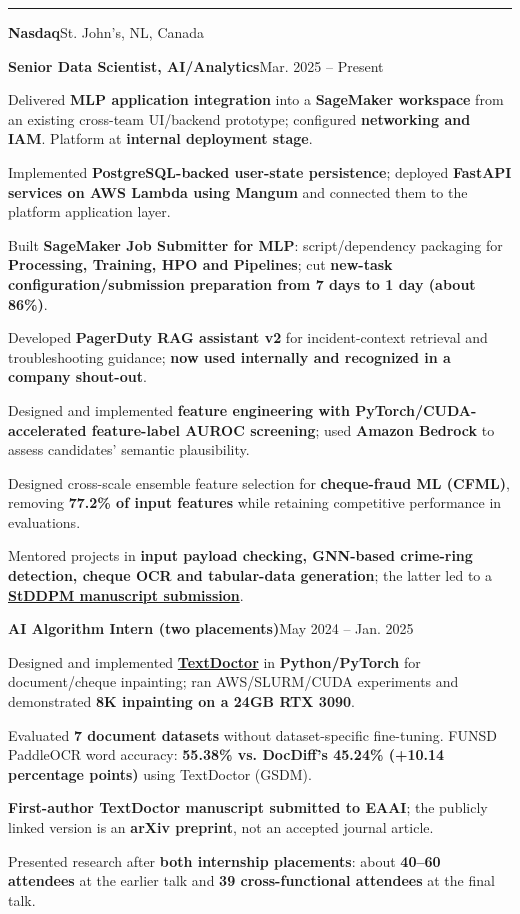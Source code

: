 \documentclass[11pt,letterpaper]{article}
\newcommand{\cvsection}[1]{\par\addvspace{6pt}{\large\bfseries #1}\par\vspace{1pt}\hrule\vspace{3pt}}
\newcommand{\company}[2]{\par\addvspace{4pt}\textbf{#1}\hfill{\small\color{muted}#2}\par}
\newcommand{\position}[2]{\par\addvspace{2pt}\textbf{#1}\hfill{\small #2}\par}
\newenvironment{points}{\begin{list}{\textbullet}{\setlength{\leftmargin}{12pt}\setlength{\itemsep}{1.2pt}\setlength{\parsep}{0pt}\setlength{\topsep}{1.5pt}\setlength{\partopsep}{0pt}}}{\end{list}}
\begin{document}
\cvsection{Professional Experience}
\company{Nasdaq}{St. John's, NL, Canada}
\position{Senior Data Scientist, AI/Analytics}{Mar. 2025 -- Present}
\begin{points}
\item Delivered \textbf{MLP application integration} into a \textbf{SageMaker workspace} from an existing cross-team UI/backend prototype; configured \textbf{networking and IAM}. Platform at \textbf{internal deployment stage}.
\item Implemented \textbf{PostgreSQL-backed user-state persistence}; deployed \textbf{FastAPI services on AWS Lambda using Mangum} and connected them to the platform application layer.
\item Built \textbf{SageMaker Job Submitter for MLP}: script/dependency packaging for \textbf{Processing, Training, HPO and Pipelines}; cut \textbf{new-task configuration/submission preparation from 7 days to 1 day (about 86\%)}.
\item Developed \textbf{PagerDuty RAG assistant v2} for incident-context retrieval and troubleshooting guidance; \textbf{now used internally and recognized in a company shout-out}.
\item Designed and implemented \textbf{feature engineering with PyTorch/CUDA-accelerated feature-label AUROC screening}; used \textbf{Amazon Bedrock} to assess candidates' semantic plausibility.
\item Designed cross-scale ensemble feature selection for \textbf{cheque-fraud ML (CFML)}, removing \textbf{77.2\% of input features} while retaining competitive performance in evaluations.
\item Mentored projects in \textbf{input payload checking, GNN-based crime-ring detection, cheque OCR and tabular-data generation}; the latter led to a \href{https://doi.org/10.21203/rs.3.rs-7624993/v1}{\textbf{StDDPM manuscript submission}}.
\end{points}

\position{AI Algorithm Intern (two placements)}{May 2024 -- Jan. 2025}
\begin{points}
\item Designed and implemented \href{https://arxiv.org/abs/2503.04021}{\textbf{TextDoctor}} in \textbf{Python/PyTorch} for document/cheque inpainting; ran AWS/SLURM/CUDA experiments and demonstrated \textbf{8K inpainting on a 24GB RTX 3090}.
\item Evaluated \textbf{7 document datasets} without dataset-specific fine-tuning. FUNSD PaddleOCR word accuracy: \textbf{55.38\% vs. DocDiff's 45.24\% (+10.14 percentage points)} using TextDoctor (GSDM).
\item \textbf{First-author TextDoctor manuscript submitted to EAAI}; the publicly linked version is an \textbf{arXiv preprint}, not an accepted journal article.
\item Presented research after \textbf{both internship placements}: about \textbf{40--60 attendees} at the earlier talk and \textbf{39 cross-functional attendees} at the final talk.
\end{points}
\end{document}
